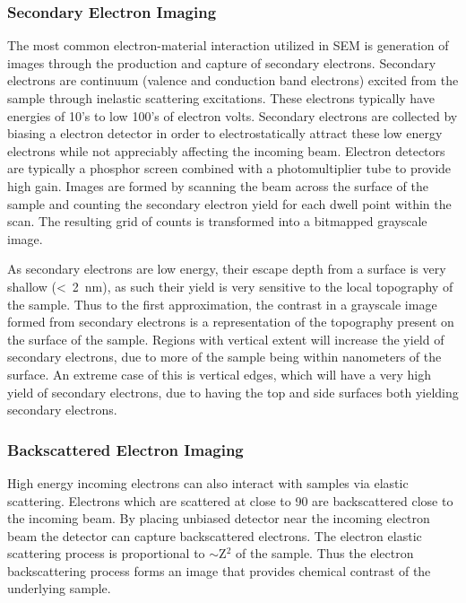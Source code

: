 \subsubsection{Secondary Electron Imaging}
The most common electron-material interaction utilized in SEM is generation of images through the production and capture of secondary electrons. Secondary electrons are continuum (valence and conduction band electrons) excited from the sample through inelastic scattering excitations. These electrons typically have energies of 10's to low 100's of electron volts. Secondary electrons are collected by biasing a electron detector in order to electrostatically attract these low energy electrons while not appreciably affecting the incoming beam. Electron detectors are typically a phosphor screen combined with a photomultiplier tube to provide high gain. Images are formed by scanning the beam across the surface of the sample and counting the secondary electron yield for each dwell point within the scan. The resulting grid of counts is transformed into a bitmapped grayscale image.

As secondary electrons are low energy, their escape depth from a surface is very shallow (<~2~nm), as such their yield is very sensitive to the local topography of the sample. Thus to the first approximation, the contrast in a grayscale image formed from secondary electrons is a representation of the topography present on the surface of the sample. Regions with vertical extent will increase the yield of secondary electrons, due to more of the sample being within nanometers of the surface. An extreme case of this is vertical edges, which will have a very high yield of secondary electrons, due to having the top and side surfaces both yielding secondary electrons.

\subsubsection{Backscattered Electron Imaging}
High energy incoming electrons can also interact with samples via elastic scattering. Electrons which are scattered at close to 90\degree{} are backscattered close to the incoming beam. By placing unbiased detector near the incoming electron beam the detector can capture backscattered electrons. The electron elastic scattering process is proportional to $\sim$Z$^2$ of the sample. Thus the electron backscattering process forms an image that provides chemical contrast of the underlying sample. 

